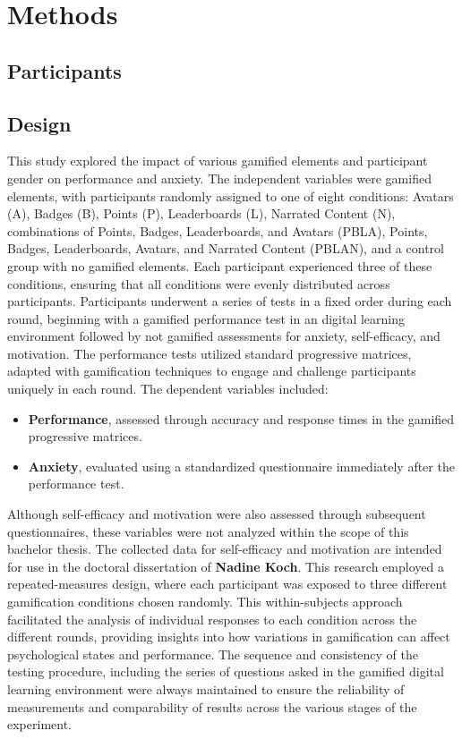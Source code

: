 \section{Methods}
\subsection{Participants}
\subsection{Design}
This study explored the impact of various gamified elements and participant gender on performance and anxiety.
The independent variables were gamified elements, with participants randomly assigned to one of eight conditions: Avatars (A), Badges (B), Points (P), Leaderboards (L), Narrated Content (N), combinations of Points, Badges, Leaderboards, and Avatars (PBLA), Points, Badges, Leaderboards, Avatars, and Narrated Content (PBLAN), and a control group with no gamified elements.
Each participant experienced three of these conditions, ensuring that all conditions were evenly distributed across participants.
Participants underwent a series of tests in a fixed order during each round, beginning with a gamified performance test in an digital learning environment followed by  not gamified assessments for anxiety, self-efficacy, and motivation.
The performance tests utilized standard progressive matrices, adapted with gamification techniques to engage and challenge participants uniquely in each round.
The dependent variables included:
\begin{itemize}
    \item \textbf{Performance}, assessed through accuracy and response times in the gamified progressive matrices.
    \item \textbf{Anxiety}, evaluated using a standardized questionnaire immediately after the performance test.
\end{itemize}

Although self-efficacy and motivation were also assessed through subsequent questionnaires, these variables were not analyzed within the scope of this bachelor thesis.
The collected data for self-efficacy and motivation are intended for use in the doctoral dissertation of \textbf{Nadine Koch}.
This research employed a repeated-measures design, where each participant was exposed to three different gamification conditions chosen randomly.
This within-subjects approach facilitated the analysis of individual responses to each condition across the different rounds, providing insights into how variations in gamification can affect psychological states and performance.
The sequence and consistency of the testing procedure, including the series of questions asked in the gamified digital learning environment were always maintained to ensure the reliability of measurements and comparability of results across the various stages of the experiment.

